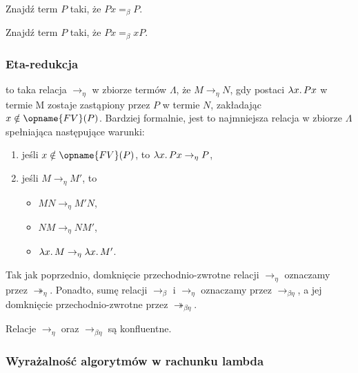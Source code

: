 \documentclass[polish,pretty,bibliography=totocnumbered]{angav}
\newcommand{\toto}{\twoheadrightarrow}
\newcommand{\FV}{\opname{FV}}
\begin{document}
\begin{problem}
    Znajdź term $P$ taki, że $Px =_\beta P$.
\end{problem}

\begin{problem}
    Znajdź term $P$ taki, że $Px =_\beta xP$.
\end{problem}

\subsubsection{Eta-redukcja}

 to taka relacja $\to_\eta$ w zbiorze termów $\Lambda$, że $M \to_\eta N$, gdy  postaci $\lambda x\ldotp Px$ w termie M zostaje zastąpiony przez $P$ w termie $N$, zakładając $x \notin \FV(P)$.
Bardziej formalnie, jest to najmniejsza relacja w zbiorze $\Lambda$ spełniająca następujące warunki:
\begin{enumerate}
    \item jeśli $x \notin \FV(P)$, to $\lambda x\ldotp Px \to_\eta P$,
    \item jeśli $M \to_\eta M'$, to
    \begin{itemize}[nosep]
        \item $MN \to_\eta M'N$,
        \item $NM \to_\eta NM'$,
        \item $\lambda x\ldotp M \to_\eta \lambda x\ldotp M'$.
    \end{itemize}
\end{enumerate}

Tak jak poprzednio, domknięcie przechodnio-zwrotne relacji $\to_\eta$ oznaczamy przez $\toto_\eta$. Ponadto, sumę relacji $\to_\beta$ i $\to_\eta$ oznaczamy przez $\to_{\beta\eta}$, a jej domknięcie przechodnio-zwrotne przez $\toto_{\beta\eta}$.

\begin{theorem}
    Relacje $\to_\eta$ oraz $\to_{\beta\eta}$ są konfluentne.
\end{theorem}

\subsubsection{Wyrażalność algorytmów w rachunku lambda}
\end{document}
